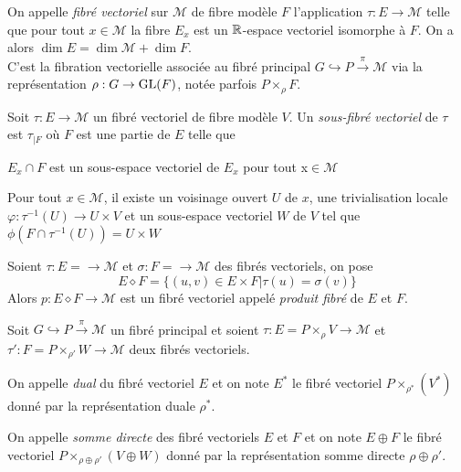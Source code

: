\documentclass[12pt, a4paper]{book}
\begin{document}
\begin{defi}
On appelle \emph{fibré vectoriel} sur $\mathcal{M}$ de fibre modèle $F$ l'application $\tau: E \to \mathcal{M}$ telle que pour tout $x\in \mathcal{M}$ la fibre $E_x$ est un $\mathbb{R}$-espace vectoriel isomorphe à $F$. On a alors $\dim E = \dim \mathcal{M} + \dim F$. \\
C'est la fibration vectorielle associée au fibré principal $G \hookrightarrow P \overset{\pi}{\to} \mathcal{M}$ via la représentation $\rho : G \to \operatorname{GL}(F)$, notée parfois $P\times_\rho F$.
\end{defi}

\begin{defi}
Soit $\tau: E \to \mathcal{M}$ un fibré vectoriel de fibre modèle $V$. Un \emph{sous-fibré vectoriel} de $\tau$ est $\tau_{|F}$ où $F$ est une partie de $E$ telle que 
\be
	\item $E_x \cap F$ est un sous-espace vectoriel de $E_x$ pour tout x$\in \mathcal{M}$
	\item Pour tout $x \in \mathcal{M}$, il existe un voisinage ouvert $U$ de $x$, une trivialisation locale $\varphi: \tau^{-1}(U) \to U\times V$ et un sous-espace vectoriel $W$ de $V$ tel que $\phi(F \cap \tau^{-1}(U)) = U \times W$ \\
\ee 
\end{defi}

\begin{defi}
Soient $\tau : E = \to \mathcal{M}$ et $\sigma : F = \to \mathcal{M}$ des fibrés vectoriels, on pose 
$$E\diamond F = \{(u,v) \in E\times F | \tau(u) = \sigma(v)\}$$
Alors $p: E\diamond F \to \mathcal{M}$ est un fibré vectoriel appelé \emph{produit fibré} de $E$ et $F$.
\end{defi}

Soit $G \hookrightarrow P \overset{\pi}{\to} \mathcal{M}$ un fibré principal et soient $\tau : E = P\times_\rho V \to \mathcal{M}$ et $\tau' : F = P\times_{\rho'} W  \to \mathcal{M}$ deux fibrés vectoriels. \\

\begin{defi}
On appelle \emph{dual} du fibré vectoriel $E$ et on note $E^*$ le fibré vectoriel $P \times_{\rho^*} (V^*)$ donné par la représentation duale $\rho^*$.
\end{defi}

\begin{defi}
On appelle \emph{somme directe} des fibré vectoriels $E$ et $F$ et on note $E\oplus F$ le fibré vectoriel $P \times_{\rho \oplus \rho'} (V\oplus W)$ donné par la représentation somme directe $\rho \oplus \rho'$.
\end{defi}
\end{document}
